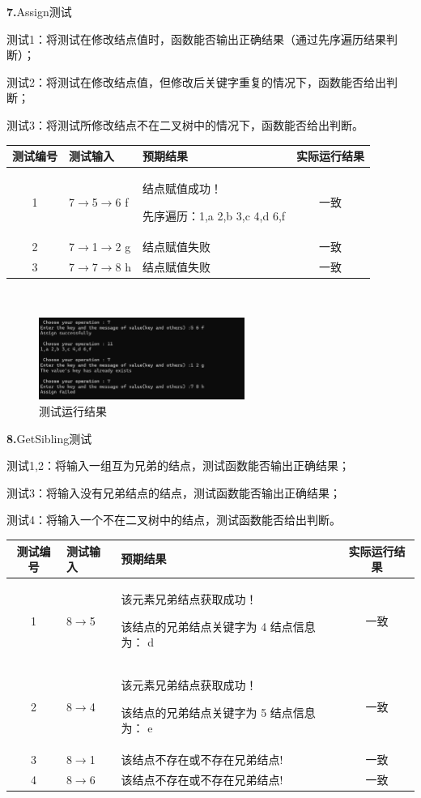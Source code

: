 \documentclass[supercite]{Experimental_Report}
\theoremstyle{definition}
\begin{document}
\noindent\textbf{ 7.}Assign测试

测试1：将测试在修改结点值时，函数能否输出正确结果（通过先序遍历结果判断）；

测试2：将测试在修改结点值，但修改后关键字重复的情况下，函数能否给出判断；

测试3：将测试所修改结点不在二叉树中的情况下，函数能否给出判断。

\vspace{0.5em}

\begin{tabular}{|c|l|p{6cm}|c|}
	\hline
	测试编号 & 测试输入 & 预期结果 & 实际运行结果 \\
	\hline
	1 & 7$\rightarrow$5$\rightarrow$6 f & 结点赋值成功！

先序遍历：1,a 2,b 3,c 4,d 6,f & 一致 \\
	\hline
	2 & 7$\rightarrow$1$\rightarrow$2 g & 结点赋值失败 & 一致 \\
	\hline
	3 & 7$\rightarrow$7$\rightarrow$8 h & 结点赋值失败 & 一致 \\
	\hline
\end{tabular}

~\

\begin{figure}[H]
 	\centering
 	\includegraphics[width=0.6\textwidth]{images/二叉树测试7.png}
 	\caption{测试运行结果}
 	\label{txlab}
 \end{figure}

\noindent\textbf{ 8.}GetSibling测试

测试1,2：将输入一组互为兄弟的结点，测试函数能否输出正确结果；

测试3：将输入没有兄弟结点的结点，测试函数能否输出正确结果；

测试4：将输入一个不在二叉树中的结点，测试函数能否给出判断。

\vspace{0.5em}

\begin{tabular}{|c|l|p{7cm}|c|}
	\hline
	测试编号 & 测试输入 & 预期结果 & 实际运行结果 \\
	\hline
	1 & 8$\rightarrow$5 & 该元素兄弟结点获取成功！

该结点的兄弟结点关键字为 4 结点信息为： d & 一致 \\
	\hline
	2 & 8$\rightarrow$4 & 该元素兄弟结点获取成功！

该结点的兄弟结点关键字为 5 结点信息为： e & 一致 \\
	\hline
	3 & 8$\rightarrow$1 & 该结点不存在或不存在兄弟结点! & 一致 \\
	\hline
	4 & 8$\rightarrow$6 & 该结点不存在或不存在兄弟结点! & 一致 \\
	\hline
\end{tabular}
\end{document}
